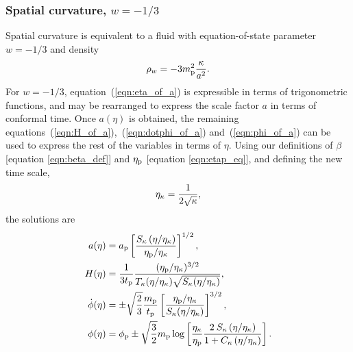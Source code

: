 \subsubsection{Spatial curvature, $w=-1/3$}
Spatial curvature is equivalent to a fluid with equation-of-state parameter $w=-1/3$ and density
%
\begin{equation}
  \rho_w = -3m_{\mathrm{p}}^2\frac{\kappa}{a^{2}}.
\end{equation}
%
For $w=-1/3$, equation~(\ref{eqn:eta_of_a}) is expressible in terms of trigonometric functions, and may be rearranged to express the scale factor $a$ in terms of conformal time. Once $a(\eta)$ is obtained, the remaining equations~(\ref{eqn:H_of_a}),~(\ref{eqn:dotphi_of_a}) and~(\ref{eqn:phi_of_a}) can be used to express the rest of the variables in terms of $\eta$. Using our definitions of $\beta$ [equation \nolinebreak\ref{eqn:beta_def}] and $\eta_{\mathrm{p}}$ [equation \nolinebreak\ref{eqn:etap_eq}], and defining the new time scale,
%
\begin{equation}
  \eta_\mathrm{\kappa} = \frac{1}{2\sqrt{\kappa}},
  \label{eqn:etak}
\end{equation}
%
the solutions are 
%
\begin{align}
  a(\eta)
  &=
  a_{\mathrm{p}}\left[
  \frac
  {S_\kappa\left(\eta/\eta_\mathrm{\kappa}\right)}
  {\eta_{\mathrm{p}}/\eta_\mathrm{\kappa}} \right]^{1/2},
  \\
  H(\eta)
  &=
  \frac{1}{3t_{\mathrm{p}}}
  \frac{(\eta_{\mathrm{p}}/\eta_\mathrm{\kappa})^{3/2}}
  {T_\kappa(\eta/\eta_\mathrm{\kappa})\sqrt{S_\kappa(\eta/\eta_\mathrm{\kappa})}}, 
  \\
  \dot{\phi}(\eta)
  &=
  \pm\sqrt{\frac{2}{3}}
  \frac{m_{\mathrm{p}}}{t_{\mathrm{p}}}
  \left[
  \frac
  {\eta_{\mathrm{p}}/\eta_\mathrm{\kappa}}
  {S_{\kappa}(\eta/\eta_\mathrm{\kappa})}
  \right]^{3/2},
  \\
  \phi(\eta) 
  &=
  \phi_{\mathrm{p}} \pm \sqrt{\frac{3}{2}}m_{\mathrm{p}}\log  \left[
  \frac{\eta_\mathrm{\kappa}}{\eta_{\mathrm{p}}} 
  \frac{2\:S_{\kappa}\left(\eta/\eta_\mathrm{\kappa} \right) }
  {1 + C_{\kappa} \left( \eta/\eta_\mathrm{\kappa} \right)   }  
  \right]. 
\end{align}
%



